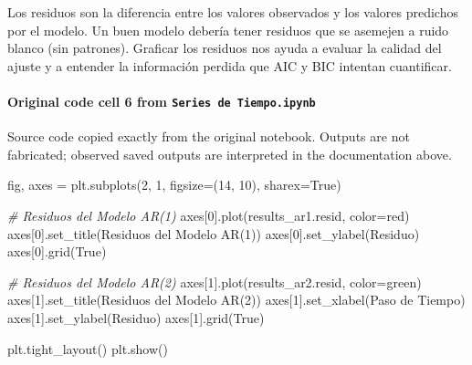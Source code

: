 \documentclass[
  11pt,
]{article}
\newenvironment{Shaded}{}{}
\newcommand{\CommentTok}[1]{\textcolor[rgb]{0.38,0.63,0.69}{\textit{#1}}}
\newcommand{\DecValTok}[1]{\textcolor[rgb]{0.25,0.63,0.44}{#1}}
\newcommand{\NormalTok}[1]{#1}
\newcommand{\OperatorTok}[1]{\textcolor[rgb]{0.40,0.40,0.40}{#1}}
\newcommand{\StringTok}[1]{\textcolor[rgb]{0.25,0.44,0.63}{#1}}
\newcommand{\VariableTok}[1]{\textcolor[rgb]{0.10,0.09,0.49}{#1}}
\begin{document}
Los residuos son la diferencia entre los valores observados y los valores predichos por el modelo. Un buen modelo debería tener residuos que se asemejen a ruido blanco (sin patrones). Graficar los residuos nos ayuda a evaluar la calidad del ajuste y a entender la \textquotesingle información perdida\textquotesingle{} que AIC y BIC intentan cuantificar.

\paragraph{\texorpdfstring{Original code cell 6 from \texttt{Series\ de\ Tiempo.ipynb}}{Original code cell 6 from Series de Tiempo.ipynb}}\label{original-code-cell-6-from-series-de-tiempoipynb}

Source code copied exactly from the original notebook. Outputs are not fabricated; observed saved outputs are interpreted in the documentation above.

\begin{Shaded}
\begin{Highlighting}[]
\NormalTok{fig, axes }\OperatorTok{=}\NormalTok{ plt.subplots(}\DecValTok{2}\NormalTok{, }\DecValTok{1}\NormalTok{, figsize}\OperatorTok{=}\NormalTok{(}\DecValTok{14}\NormalTok{, }\DecValTok{10}\NormalTok{), sharex}\OperatorTok{=}\VariableTok{True}\NormalTok{)}

\CommentTok{\# Residuos del Modelo AR(1)}
\NormalTok{axes[}\DecValTok{0}\NormalTok{].plot(results\_ar1.resid, color}\OperatorTok{=}\StringTok{\textquotesingle{}red\textquotesingle{}}\NormalTok{)}
\NormalTok{axes[}\DecValTok{0}\NormalTok{].set\_title(}\StringTok{\textquotesingle{}Residuos del Modelo AR(1)\textquotesingle{}}\NormalTok{)}
\NormalTok{axes[}\DecValTok{0}\NormalTok{].set\_ylabel(}\StringTok{\textquotesingle{}Residuo\textquotesingle{}}\NormalTok{)}
\NormalTok{axes[}\DecValTok{0}\NormalTok{].grid(}\VariableTok{True}\NormalTok{)}

\CommentTok{\# Residuos del Modelo AR(2)}
\NormalTok{axes[}\DecValTok{1}\NormalTok{].plot(results\_ar2.resid, color}\OperatorTok{=}\StringTok{\textquotesingle{}green\textquotesingle{}}\NormalTok{)}
\NormalTok{axes[}\DecValTok{1}\NormalTok{].set\_title(}\StringTok{\textquotesingle{}Residuos del Modelo AR(2)\textquotesingle{}}\NormalTok{)}
\NormalTok{axes[}\DecValTok{1}\NormalTok{].set\_xlabel(}\StringTok{\textquotesingle{}Paso de Tiempo\textquotesingle{}}\NormalTok{)}
\NormalTok{axes[}\DecValTok{1}\NormalTok{].set\_ylabel(}\StringTok{\textquotesingle{}Residuo\textquotesingle{}}\NormalTok{)}
\NormalTok{axes[}\DecValTok{1}\NormalTok{].grid(}\VariableTok{True}\NormalTok{)}

\NormalTok{plt.tight\_layout()}
\NormalTok{plt.show()}
\end{Highlighting}
\end{Shaded}
\end{document}
